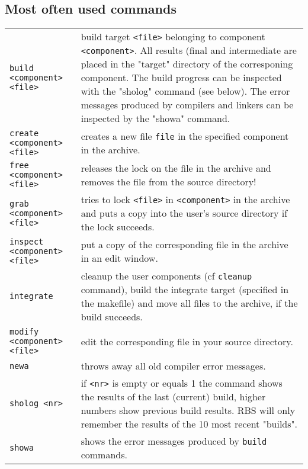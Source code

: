\subsection{Most often used commands}
\begin{tabular}{l p{7.7cm}}
\verb+build <component> <file>+ & build target \verb+<file>+ belonging to component
                                  \verb+<component>+. All results (final and 
                                  intermediate are placed in the "target"
                                  directory of the corresponing component.
                                  The build progress can be inspected with the
                                  "sholog" command (see below). The error
                                  messages produced by compilers and linkers
                                  can be inspected by the "showa" command.\\
\verb+create <component> <file>+ & creates a new file \verb+file+ in the 
                                  specified
                                  component in the archive.  \\
\verb+free <component> <file>+  & releases the lock on the file in the archive
                                  and removes the file from the source 
                                  directory!\\
\verb+grab <component> <file>+ & tries to lock \verb+<file>+ in \verb+<component>+ 
                                  in the
                                  archive and puts a copy into the user's
                                  source directory if the lock succeeds.\\
\verb+inspect <component> <file>+ & put a copy of the corresponding file in the
                                  archive in an edit window.\\
\verb+integrate+                       & cleanup the user components (cf \verb+cleanup+
                                  command), build the 
                                  integrate target (specified in the makefile)
                                  and move all files to the archive, if the
                                  build succeeds.\\
\verb+modify <component> <file>+ & edit the corresponding file in your source
                                  directory.\\
\verb+newa+                            & throws away all old compiler error messages.\\

\verb+sholog <nr>+                     & if \verb+<nr>+ is empty or equals 1 the command 
                                  shows the results of the last (current) build,
                                  higher numbers show previous build results.
                                  RBS will only remember the results of the
                                  10 most recent "builds".\\
\verb+showa+                           & shows the error messages produced by \verb+build+
                                  commands.\\
\end{tabular}
